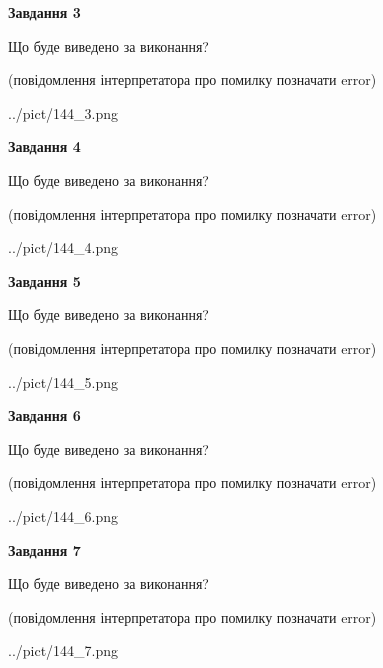 \documentclass[12pt, ukrainian]{article}
\begin{document}
{\begin {large}
{\begin {center}\textbf{Завдання 3}\end {center}}\par
Що буде виведено за виконання?\par
 (повідомлення інтерпретатора про помилку позначати error)\par
\begin{center}
	{../pict/144_3.png}
\end{center}
\newpage

{\begin {center}\textbf{Завдання 4}\end {center}}\par
Що буде виведено за виконання?\par
 (повідомлення інтерпретатора про помилку позначати error)\par
\begin{center}
	{../pict/144_4.png}
\end{center}
\newpage

{\begin {center}\textbf{Завдання 5}\end {center}}\par
Що буде виведено за виконання?\par
 (повідомлення інтерпретатора про помилку позначати error)\par
\begin{center}
	{../pict/144_5.png}
\end{center}
\newpage

{\begin {center}\textbf{Завдання 6}\end {center}}\par
Що буде виведено за виконання?\par
 (повідомлення інтерпретатора про помилку позначати error)\par
\begin{center}
	{../pict/144_6.png}
\end{center}
\newpage

{\begin {center}\textbf{Завдання 7}\end {center}}\par
Що буде виведено за виконання?\par
 (повідомлення інтерпретатора про помилку позначати error)\par
\begin{center}
	{../pict/144_7.png}
\end{center}
\newpage


\end{large}}
\end{document}
